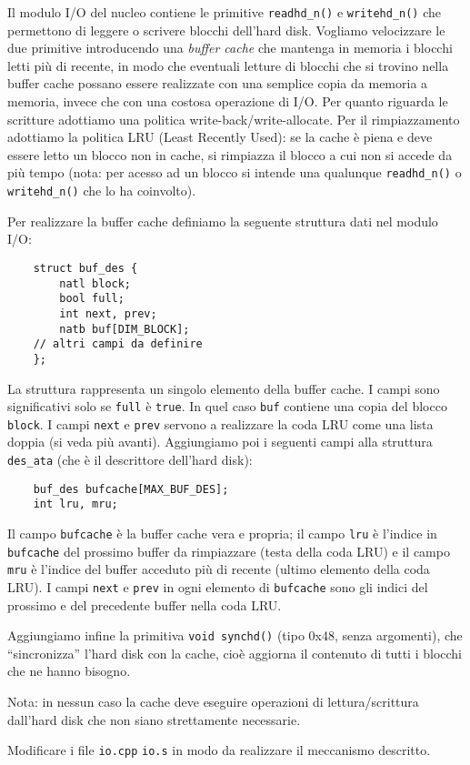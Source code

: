 Il modulo I/O del nucleo contiene le primitive \texttt{readhd\_n()} e \texttt{writehd\_n()} che
permettono di leggere o scrivere blocchi dell'hard disk. Vogliamo velocizzare le due primitive
introducendo una {\em buffer cache} che mantenga in memoria i blocchi letti pi\`u di recente,
in modo che eventuali letture di blocchi che si trovino nella buffer cache possano essere realizzate
con una semplice copia da memoria a memoria, invece che con una costosa operazione di I/O.
Per quanto riguarda le scritture adottiamo una politica write-back/write-allocate. Per il rimpiazzamento
adottiamo la politica LRU (Least Recently Used): se la cache \`e piena e deve essere letto un blocco
non in cache, si rimpiazza il blocco a cui non si accede da pi\`u tempo (nota: per acesso ad un blocco
si intende una qualunque \texttt{readhd\_n()} o \texttt{writehd\_n()} che lo ha coinvolto).

Per realizzare la buffer cache definiamo la seguente struttura dati nel modulo I/O:
\begin{verbatim}
    struct buf_des {
        natl block;
        bool full;
        int next, prev;
        natb buf[DIM_BLOCK];
	// altri campi da definire
    };
\end{verbatim}
La struttura rappresenta un singolo elemento della buffer cache. I campi sono significativi solo
se \texttt{full} \`e \texttt{true}. In quel caso \texttt{buf} contiene una copia del blocco \texttt{block}.
I campi \texttt{next} e \texttt{prev} servono a realizzare la coda LRU come una lista doppia (si veda pi\`u avanti).
Aggiungiamo poi i seguenti campi alla struttura \texttt{des\_ata} (che \`e il descrittore dell'hard disk):
\begin{verbatim}
    buf_des bufcache[MAX_BUF_DES];
    int lru, mru;
\end{verbatim}
Il campo \texttt{bufcache} \`e la buffer cache vera e propria; il campo \texttt{lru} \`e l'indice in \texttt{bufcache}
del prossimo buffer da rimpiazzare (testa della coda LRU) e il campo \texttt{mru} \`e l'indice del buffer acceduto pi\`u di recente (ultimo elemento della coda LRU).
I campi \texttt{next} e \texttt{prev} in ogni elemento di \texttt{bufcache} sono gli indici del prossimo e del precedente buffer nella coda LRU.

Aggiungiamo infine la primitiva \texttt{void synchd()} (tipo 0x48, senza argomenti), che ``sincronizza'' l'hard disk
con la cache, cio\`e aggiorna il contenuto di tutti i blocchi che ne hanno bisogno.

Nota: in nessun caso la cache deve eseguire operazioni di lettura/scrittura dall'hard disk che non siano
strettamente necessarie.

Modificare i file \verb|io.cpp| \verb|io.s| in modo da realizzare il meccanismo descritto.
